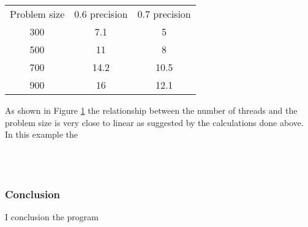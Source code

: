 \documentclass{article}
\begin{document}
\begin{center}
\begin{tabular}{ |c|c|c| }
 \hline
  Problem size & 0.6 precision & 0.7 precision \\
  300 & 7.1 & 5\\
  500 & 11 & 8\\
  700 & 14.2 & 10.5\\
  900 & 16 & 12.1\\
 \hline
\end{tabular}
\end{center}

As shown in Figure \ref{fig:Isoefficiency} the relationship between the number of threads
and the problem size is very close to linear as suggested by the calculations done
above. In this example the 

\begin{figure}[H]
 \centering
 \caption{}
 \label{fig:Isoefficiency}
\end{figure}\\~\\

\subsubsection{Conclusion}

I conclusion the program
\end{document}
